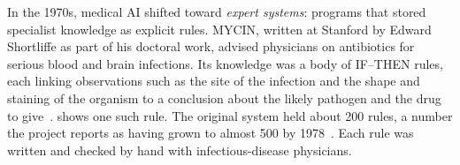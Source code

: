 \begin{reviewrewrite}
In the 1970s, medical AI shifted toward \emph{expert systems}: programs that stored specialist knowledge as explicit rules. MYCIN, written at Stanford by Edward Shortliffe as part of his doctoral work, advised physicians on antibiotics for serious blood and brain infections. Its knowledge was a body of IF--THEN rules, each linking observations such as the site of the infection and the shape and staining of the organism to a conclusion about the likely pathogen and the drug to give~\citep{mycin_1975}.  shows one such rule. The original system held about 200 rules, a number the project reports as having grown to almost 500 by 1978~\citep{mycin_book_1984}. Each rule was written and checked by hand with infectious-disease physicians.
\end{reviewrewrite}

